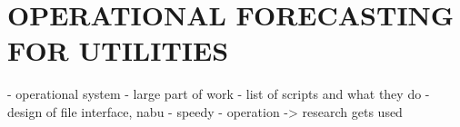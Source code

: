 \chapter{OPERATIONAL FORECASTING FOR UTILITIES}
\label{chap:operations}

- operational system
- large part of work
- list of scripts and what they do
- design of file interface, nabu
- speedy
- operation -> research gets used

